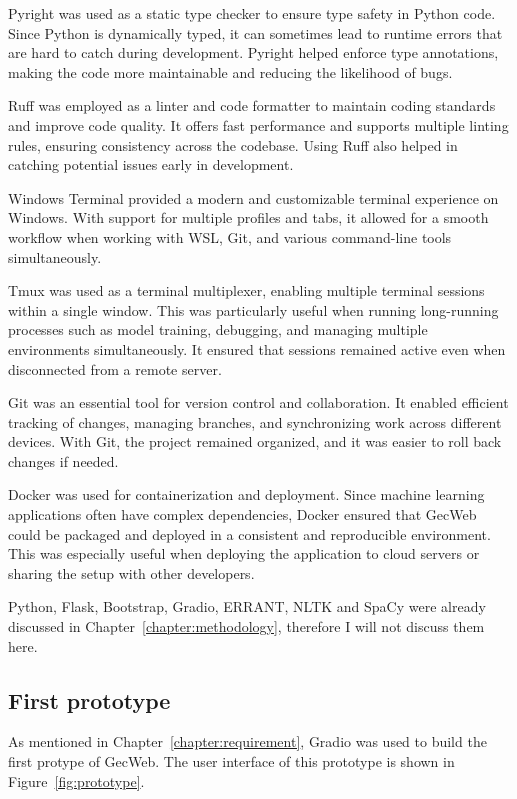 Pyright was used as a static type checker to ensure type safety in Python code.
Since Python is dynamically typed, it can sometimes lead to runtime errors that are hard to catch during development.
Pyright helped enforce type annotations, making the code more maintainable and reducing the likelihood of bugs.

Ruff was employed as a linter and code formatter to maintain coding standards and improve code quality.
It offers fast performance and supports multiple linting rules, ensuring consistency across the codebase.
Using Ruff also helped in catching potential issues early in development.

Windows Terminal provided a modern and customizable terminal experience on Windows.
With support for multiple profiles and tabs, it allowed for a smooth workflow when working with WSL, Git, and various command-line tools simultaneously.

Tmux was used as a terminal multiplexer, enabling multiple terminal sessions within a single window.
This was particularly useful when running long-running processes such as model training, debugging, and managing multiple environments simultaneously.
It ensured that sessions remained active even when disconnected from a remote server.

Git was an essential tool for version control and collaboration.
It enabled efficient tracking of changes, managing branches, and synchronizing work across different devices.
With Git, the project remained organized, and it was easier to roll back changes if needed.

Docker was used for containerization and deployment.
Since machine learning applications often have complex dependencies, Docker ensured that GecWeb could be packaged and deployed in a consistent and reproducible environment.
This was especially useful when deploying the application to cloud servers or sharing the setup with other developers.

Python, Flask, Bootstrap, Gradio, ERRANT, NLTK and SpaCy were already discussed in Chapter~\ref{chapter:methodology}, therefore I will not discuss them here.

\subsection{First prototype}

As mentioned in Chapter~\ref{chapter:requirement}, Gradio was used to build the first protype of GecWeb.
The user interface of this prototype is shown in Figure~\ref{fig:prototype}.

